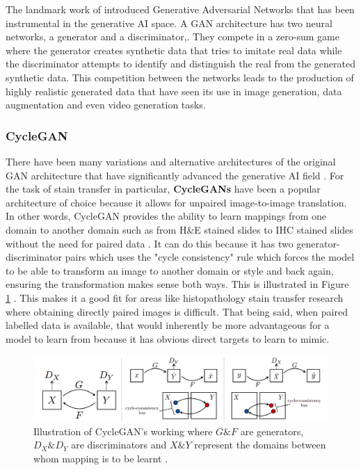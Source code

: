 The landmark work of  \textcite{Goodfellow2014GenerativeNetworks}  introduced Generative Adversarial Networks that has been instrumental in the generative AI space. A GAN architecture has two neural networks, a generator and a discriminator,. They compete in a zero-sum game where the generator creates synthetic data that tries to imitate real data while the discriminator attempts to identify and distinguish the real from the generated synthetic data. This competition between the networks leads to the production of highly realistic generated data that have seen its use in image generation, data augmentation and even video generation tasks. 

\subsubsection{CycleGAN}

There have been many variations and alternative architectures of the original GAN architecture that have significantly advanced the generative AI field \parencite{Goodfellow2020GenerativeNetworks}. For the task of stain transfer in particular, \textbf{CycleGANs} have been a popular architecture of choice because it allows for unpaired image-to-image translation. In other words, CycleGAN provides the ability to learn mappings from one domain to another domain such as from H\&E stained slides to IHC stained slides without the need for paired data \parencite{Zhu2017UnpairedNetworks}. It can do this because it has two generator-discriminator pairs which uses the "cycle consistency" rule which forces the model to be able to transform an image to another domain or style and back again, ensuring the transformation makes sense both ways. This is illustrated in Figure \ref{fig:CycleGAN} . This makes it a good fit for areas like histopathology stain transfer research where obtaining directly paired images is difficult. That being said, when paired labelled data is available, that would inherently be more advantageous for a model to learn from because it has obvious direct targets to learn to mimic.

\begin{figure}[h]
    \centering
    \includegraphics[width=1.0\linewidth]{2_LiteratureSurvey/figures/CycleGAN.png}
    \caption[CycleGAN workflow]{Illustration of CycleGAN's working where $G \& F$ are generators, $D_{X} \& D_{Y}$ are discriminators and $X \& Y$ represent the domains between whom mapping is to be learnt \parencite[Figure 3, p. 2244]{Zhu2017UnpairedNetworks}.}
    \label{fig:CycleGAN}
\end{figure}

